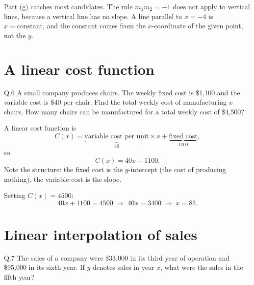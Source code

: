 \begin{pitfall}
Part (g) catches most candidates. The rule $m_1m_2=-1$ does not apply to
vertical lines, because a vertical line has no slope. A line parallel to
$x=-4$ is $x=\text{constant}$, and the constant comes from the $x$-coordinate
of the given point, not the $y$.
\end{pitfall}

\section{A linear cost function}

\begin{question}{Q.6}
A small company produces chairs. The weekly fixed cost is \$1{,}100 and the
variable cost is \$40 per chair. Find the total weekly cost of manufacturing
$x$ chairs. How many chairs can be manufactured for a total weekly cost of
\$4{,}500?
\end{question}

\begin{solution}
A linear cost function is
\[
C(x)=\underbrace{\text{variable cost per unit}}_{40}\times x
+\underbrace{\text{fixed cost}}_{1100},
\]
so
\[
C(x)=40x+1100 .
\]
Note the structure: the fixed cost is the $y$-intercept (the cost of producing
nothing), the variable cost is the slope.

\medskip
Setting $C(x)=4500$:
\[
40x+1100=4500 \;\Longrightarrow\; 40x=3400 \;\Longrightarrow\; x=85 .
\]


\end{solution}

\section{Linear interpolation of sales}

\begin{question}{Q.7}
The sales of a company were \$33{,}000 in its third year of operation and
\$95{,}000 in its sixth year. If $y$ denotes sales in year $x$, what were the
sales in the fifth year?
\end{question}


